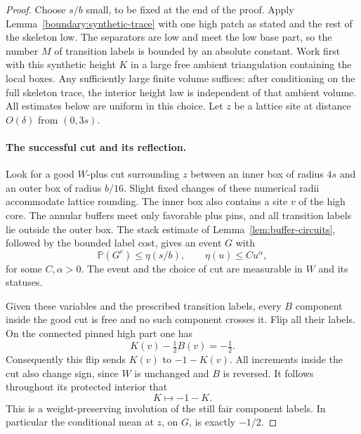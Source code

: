 \documentclass[11pt]{article}
\newcommand{\Prob}{\mathbb P}
\theoremstyle{definition}
\theoremstyle{remark}
\numberwithin{equation}{section}
\begin{document}
\begin{proof}
Choose $s/b$ small, to be fixed at the end of the proof.  Apply
Lemma~\ref{boundary:synthetic-trace} with one high patch as stated and
the rest of the skeleton low.  The separators are low and meet the
low base part, so the number $M$ of transition labels is bounded by
an absolute constant.  Work first with this synthetic height $K$ in
a large free ambient triangulation containing the local boxes.  Any
sufficiently large finite volume suffices: after conditioning on the
full skeleton trace, the interior height law is independent of that
ambient volume.  All estimates below are uniform in this choice.
Let $z$ be a lattice site at distance $O(\delta)$ from $(0,3s)$.

\paragraph{The successful cut and its reflection.}
Look for a good $W$-plus cut surrounding $z$ between an inner box of
radius $4s$ and an outer box of radius $b/16$.  Slight fixed changes
of these numerical radii accommodate lattice rounding.  The inner
box also contains a site $v$ of the high core.  The annular buffers
meet only favorable plus pins, and all transition labels lie outside
the outer box.  The stack estimate of
Lemma~\ref{lem:buffer-circuits}, followed by the bounded label cost,
gives an event $G$ with
\begin{equation}
 \Prob(G^c)\le \eta(s/b),\qquad
 \eta(u)\le C u^{\alpha},
 \label{boundary:cut-failure}
\end{equation}
for some $C,\alpha>0$.  The event and the choice of cut are measurable
in $W$ and its statuses.

Given these variables and the prescribed transition labels, every
$B$ component inside the good cut is free and no such component
crosses it.  Flip all their labels.  On the connected pinned high
part one has
\[
 K(v)-\tfrac12B(v)=-\tfrac12.
\]
Consequently this flip sends $K(v)$ to $-1-K(v)$.  All increments
inside the cut also change sign, since $W$ is unchanged and $B$ is
reversed.  It follows throughout its protected interior that
\begin{equation}
 K\longmapsto-1-K.
 \label{boundary:minus-half-reflection}
\end{equation}
This is a weight-preserving involution of the still fair component
labels.  In particular the conditional mean at $z$, on $G$, is
exactly $-1/2$.


\end{proof}
\end{document}

